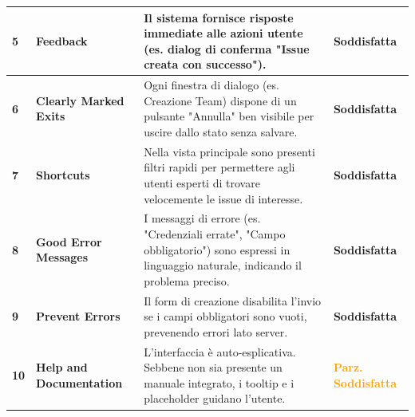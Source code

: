 \documentclass[a4paper,12pt]{article}
\begin{document}
\begin{longtable}{|p{0.8cm}|p{4.5cm}|p{5.0cm}|p{3.5cm}|}
    \textbf{5} & \textbf{Feedback} & 
    Il sistema fornisce risposte immediate alle azioni utente (es. dialog di conferma "Issue creata con successo"). & 
    \textbf{\textcolor{green!70!black}{Soddisfatta}} \\ \hline

    \textbf{6} & \textbf{Clearly Marked Exits} & 
    Ogni finestra di dialogo (es. Creazione Team) dispone di un pulsante "Annulla" ben visibile per uscire dallo stato senza salvare. & 
    \textbf{\textcolor{green!70!black}{Soddisfatta}} \\ \hline

    \textbf{7} & \textbf{Shortcuts} & 
    Nella vista principale sono presenti filtri rapidi per permettere agli utenti esperti di trovare velocemente le issue di interesse. & 
    \textbf{\textcolor{green!70!black}{Soddisfatta}} \\ \hline

    \textbf{8} & \textbf{Good Error Messages} & 
    I messaggi di errore (es. "Credenziali errate", "Campo obbligatorio") sono espressi in linguaggio naturale, indicando il problema preciso. & 
    \textbf{\textcolor{green!70!black}{Soddisfatta}} \\ \hline

    \textbf{9} & \textbf{Prevent Errors} & 
    Il form di creazione disabilita l'invio se i campi obbligatori sono vuoti, prevenendo errori lato server. & 
    \textbf{\textcolor{green!70!black}{Soddisfatta}} \\ \hline

    \textbf{10} & \textbf{Help and Documentation} & 
    L'interfaccia è auto-esplicativa. Sebbene non sia presente un manuale integrato, i tooltip e i placeholder guidano l'utente. & 
    \textbf{\textcolor{orange}{Parz. Soddisfatta}} \\ \hline
\end{longtable}
\end{document}
